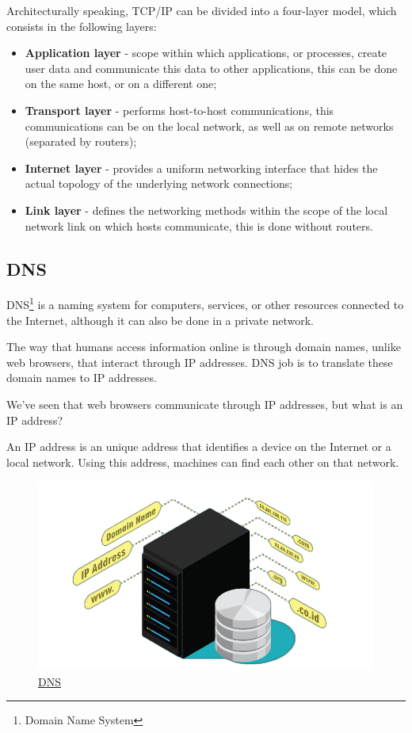 \documentclass{article}
\newcommand\tab[1][1cm]{\hspace*{#1}}
\begin{document}
Architecturally speaking, TCP/IP can be divided into a four-layer model, which consists in the following layers:

\begin{itemize}
    \item \textbf{Application layer} - scope within which applications, or processes, create user data and communicate this data to other applications, this can be done on the same host, or on a different one;
    \item \textbf{Transport layer} - performs host-to-host communications, this communications can be on the local network, as well as on remote networks (separated by routers);
    \item \textbf{Internet layer} - provides a uniform networking interface that hides the actual topology of the underlying network connections;
    \item \textbf{Link layer} - defines the networking methods within the scope of the local network link on which hosts communicate, this is done without routers.
\end{itemize}

\subsection{DNS} 

\tab DNS\footnote{Domain Name System} is a naming system for computers, services, or other resources connected to the Internet, although it can also be done in a private network.

The way that humans access information online is through domain names, unlike web browsers, that interact through IP addresses. DNS job is to translate these domain names to IP addresses.

We've seen that web browsers communicate through IP addresses, but what is an IP address?

An IP address is an unique address that identifies a device on the Internet or a local network. Using this address, machines can find each other on that network.

\begin{figure}[H]
    \begin{center}
        \includegraphics[width=0.6 \textwidth]{images/dns.png}
        \caption{\href{https://www.google.com/url?sa=i&url=https\%3A\%2F\%2Fwww.pcmag.com\%2Fhow-to\%2Fhow-and-why-to-change-your-dns-server&psig=AOvVaw0kvZbAUtDVX3KBUpHmIdu4&ust=1617099982879000&source=images&cd=vfe&ved=0CAIQjRxqFwoTCPCEmYOl1e8CFQAAAAAdAAAAABAD}{\underline{DNS}}}
    \end{center}
\end{figure}
\end{document}
